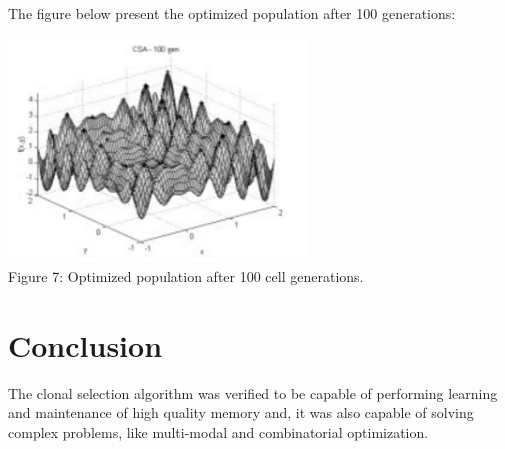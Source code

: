 \documentclass{article}
\begin{document}
The figure below present the  optimized population after 100
generations:
\begin{center} 
\includegraphics[width=8cm,clip]{images/cj_func_maxi_100.png}\\
\caption{Figure 7: Optimized population after 100 cell generations.}	
\end{center} 

\section{Conclusion}
The clonal selection algorithm was verified to be capable of performing learning and maintenance of high quality memory and, it was also capable of solving complex problems, like multi-modal and combinatorial optimization.
\end{document}
